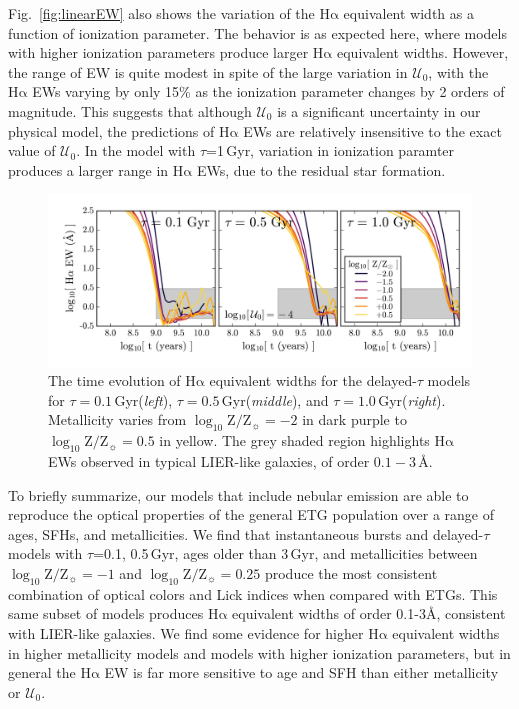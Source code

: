 \documentclass[preprint2]{aastex62}
\newcommand{\ha}{\ensuremath{\mathrm{H\alpha}}\xspace}
\newcommand{\logten}{\ensuremath{\log_{10}}}
\newcommand{\logZeq}[1]{\ensuremath{\logten \mathrm{Z}/\mathrm{Z}_{\sun} = #1}}
\newcommand{\ang}{\ensuremath{\mbox{\AA}}\xspace}
\newcommand{\U}{\ensuremath{\mathcal{U}_{0}}\xspace}
\newcommand{\Gyr}{$\,$Gyr\xspace}
\begin{document}
Fig.~\ref{fig:linearEW} also shows the variation of the \ha equivalent width as a function of ionization parameter. The behavior is as expected here, where models with higher ionization parameters produce larger \ha equivalent widths. However, the range of EW is quite modest in spite of the large variation in \U, with the \ha EWs varying by only 15\% as the ionization parameter changes by 2 orders of magnitude. This suggests that although \U is a significant uncertainty in our physical model, the predictions of \ha EWs are relatively insensitive to the exact value of \U. In the model with $\tau$=1\Gyr, variation in ionization paramter produces a larger range in \ha EWs, due to the residual star formation.

\begin{figure}
  \begin{center}
    \includegraphics[width=\linewidth]{figs/f12.png}
    \caption{The time evolution of \ha equivalent widths for the delayed-$\tau$ models for $\tau=0.1$\Gyr (\emph{left}),  $\tau=0.5$\Gyr (\emph{middle}), and $\tau=1.0$\Gyr (\emph{right}). Metallicity varies from \logZeq{-2} in dark purple to \logZeq{0.5} in yellow. The grey shaded region highlights \ha EWs observed in typical LIER-like galaxies, of order $0.1-3\,$\ang.}
    \label{fig:EWtau}
  \end{center}
\end{figure}

To briefly summarize, our models that include nebular emission are able to reproduce the optical properties of the general ETG population over a range of ages, SFHs, and metallicities. We find that instantaneous bursts and delayed-$\tau$ models with $\tau$=0.1, 0.5\Gyr, ages older than 3\Gyr, and metallicities between \logZeq{-1} and \logZeq{0.25} produce the most consistent combination of optical colors and Lick indices when compared with ETGs. This same subset of models produces \ha equivalent widths of order 0.1-3\ang, consistent with LIER-like galaxies. We find some evidence for higher \ha equivalent widths in higher metallicity models and models with higher ionization parameters, but in general the \ha EW is far more sensitive to age and SFH than either metallicity or \U.
\end{document}
